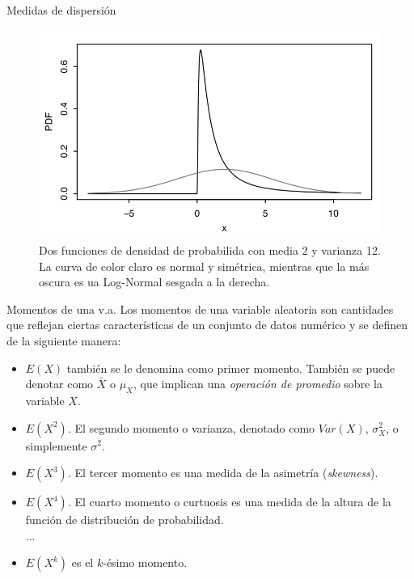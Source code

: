 \documentclass{beamer}
\begin{document}
\begin{frame}{Medidas de dispersión}
  \begin{figure}[h!]
    \centering
    \includegraphics[scale=0.5]{figures/dispersion.png}
    \caption{Dos funciones de densidad de probabilida con media 2 y varianza 12. La
    curva de color claro es normal y simétrica, mientras que la más oscura es ua
    Log-Normal sesgada a la derecha.}
  \end{figure}
\end{frame}

\begin{frame}{Momentos de una v.a.}
Los momentos de una variable aleatoria son cantidades que reflejan ciertas
características de un conjunto de datos numérico y se definen de la
siguiente manera:

\begin{itemize}
\item $E(X)$ también se le denomina como primer momento. También se puede
denotar como $\bar{X}$ o $\mu_{X}$, que implican una \textit{operación de
promedio} sobre la variable $X$.
\item $E(X^2)$. El segundo momento o varianza, denotado como $Var(X)$,
$\sigma_{X}^{2}$, o simplemente $\sigma^{2}$.
\item $E(X^3)$. El tercer momento es una medida de la asimetría
(\textit{skewness}).\\
\item $E(X^4)$. El cuarto momento o curtuosis es una medida de la altura de la
función de distribución de probabilidad.\\
  ...\\
  \item $E(X^k)$ es el $k$-ésimo momento.
\end{itemize}

\end{frame}
\end{document}
